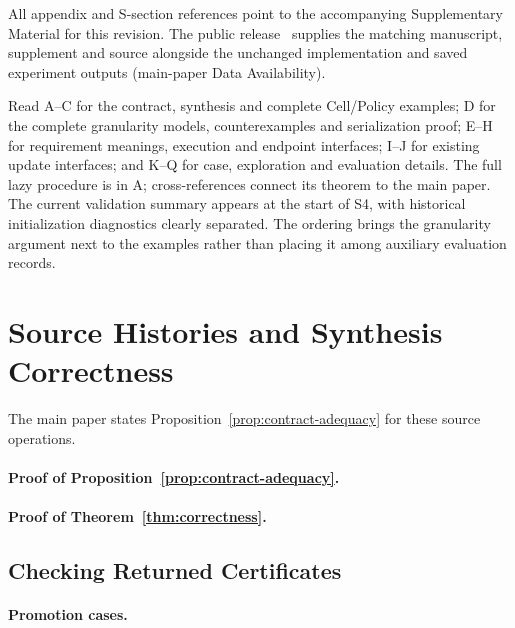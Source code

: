 \documentclass[11pt]{article}
\begin{document}
All appendix and S-section references point to the accompanying Supplementary Material for this revision. The public release~\cite{FGDUCSAnonymousArtifact} supplies the matching manuscript, supplement and source alongside the unchanged implementation and saved experiment outputs (main-paper Data Availability).

Read A--C for the contract, synthesis and complete Cell/Policy examples; D for the complete granularity models, counterexamples and serialization proof; E--H for requirement meanings, execution and endpoint interfaces; I--J for existing update interfaces; and K--Q for case, exploration and evaluation details. The full lazy procedure is in A; cross-references connect its theorem to the main paper. The current validation summary appears at the start of S4, with historical initialization diagnostics clearly separated. The ordering brings the granularity argument next to the examples rather than placing it among auxiliary evaluation records.
\FloatBarrier
\appendix
\section{Source Histories and Synthesis Correctness}\label{ta:source_synthesis}

The main paper states Proposition~\ref{prop:contract-adequacy} for these source operations.
\paragraph{Proof of Proposition~\ref{prop:contract-adequacy}.}







\paragraph{Proof of Theorem~\ref{thm:correctness}.}

\subsection{Checking Returned Certificates}\label{ta:certificate_checks}

\paragraph{Promotion cases.}\label{ta:promotion_cases}


\FloatBarrier
\FloatBarrier
{}
\end{document}
